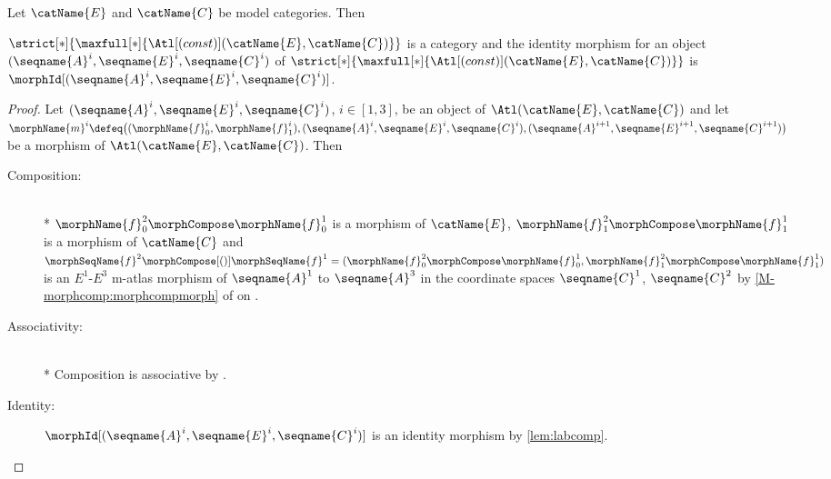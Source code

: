\documentclass{article}
\begin{document}
\begin{lemma}
\label{lem:M-cat-ATLiscat}
Let $\catName{E}$ and $\catName{C}$ be model categories. Then

$
  \strict[*]
  {
    \maxfull[*]
    {
      \Atl[(const)](\catName{E}, \catName{C})
    }
  }
$
is a category and the identity morphism for an object
$(\seqname{A}^i, \seqname{E}^i, \seqname{C}^i)$ of
$
  \strict[*]
  {
    \maxfull[*]
    {
      \Atl[(const)](\catName{E}, \catName{C})
    }
  }
$
is $\morphId[{{(\seqname{A}^i, \seqname{E}^i, \seqname{C}^i)}}]$.

\begin{proof}
Let $(\seqname{A}^i,\seqname{E}^i,\seqname{C}^i)$, $i \in [1,3]$,
be an object of $\Atl(\catName{E}, \catName{C})$ and
let \\
$
  \morphName{m}^i \defeq
  \bigl (
    (\morphName{f}_0^i,\morphName{f}_1^i),
    (\seqname{A}^i,\seqname{E}^i,\seqname{C}^i),
    (\seqname{A}^{i+1},\seqname{E}^{i+1},\seqname{C}^{i+1})
  \bigr )
$
be a morphism of $\Atl(\catName{E}, \catName{C})$. Then
\begin{description}
\item[Composition:]
\leavevmode \\*
$\morphName{f}_0^2 \morphCompose \morphName{f}_0^1$ is a morphism of
$\catName{E}$, $\morphName{f}_1^2 \morphCompose \morphName{f}_1^1$ is a
morphism of $\catName{C}$ and
$
  \morphSeqName{f}^2 \morphCompose[()] \morphSeqName{f}^1 =
  (
    \morphName{f}_0^2 \morphCompose \morphName{f}_0^1,
    \morphName{f}_1^2 \morphCompose \morphName{f}_1^1
  )
$
is an $E^1$-$E^3$ m-atlas morphism of $\seqname{A}^1$ to $\seqname{A}^3$
in the coordinate spaces $\seqname{C}^1$, $\seqname{C}^2$ by
\cref{M-morphcomp:morphcompmorph} of
{
  \showlabelsinline
   on
  .
}

\item[Associativity:]
\leavevmode \\*
Composition is associative by .

\item[Identity:]
$\morphId[{{(\seqname{A}^i, \seqname{E}^i, \seqname{C}^i)}}]$ is an identity
morphism by \cref{lem:labcomp}.
\end{description}
\end{proof}
\end{lemma}
\end{document}
